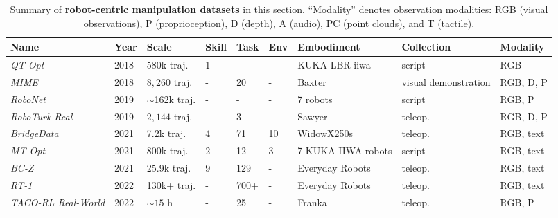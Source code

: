 \begin{table}[!ht]
    \centering
    \footnotesize
    \scriptsize
    \caption{Summary of \textbf{robot-centric manipulation datasets} in this section. ``Modality'' denotes observation modalities: RGB (visual observations), P (proprioception), D (depth), A (audio), PC (point clouds), and T (tactile).}
    \label{tab: robot_data}
    \vspace{-6pt}
    
    \renewcommand{\arraystretch}{1.4}
    \renewcommand\tabcolsep{4pt}
    
    \begin{tabular}{l p{0.7cm} p{1.8cm} p{1.7cm} p{1.2cm} p{1.2cm} p{1.5cm} p{1.7cm} p{1.5cm}}
    \toprule
    \textbf{Name} & \textbf{Year} & \textbf{Scale} & \textbf{Skill} & \textbf{Task} & \textbf{Env} & \textbf{Embodiment} & \textbf{Collection} & \textbf{Modality} \\
    \midrule

    \textit{QT-Opt} \cite{QT-Opt} & 2018 & 580k traj. 
    & 1 & - & - & KUKA LBR iiwa & script & RGB \\

    \textit{MIME}\cite{MIME} & 2018 & $8,260$ traj. 
    & - & 20 & - & Baxter & visual demonstration & RGB, D, P \\
    
    \textit{RoboNet} \cite{RoboNet}& 2019 & $\sim$162k traj. 
    & - & - & - & 7 robots & script & RGB, P \\

    \textit{RoboTurk-Real} \cite{RoboTurk} & 2019 & $2,144$ traj. 
    & - & 3 & - & Sawyer & teleop. & RGB, D, P \\
    
    \textit{BridgeData} \cite{Bridge} & 2021 & 7.2k traj. 
    & 4 & 71 & 10 & WidowX250s & teleop. & RGB, text \\
    
    \textit{MT-Opt} \cite{MT-Opt} & 2021 & 800k traj. 
    & 2 & 12 & 3 & 7 KUKA IIWA robots  & script & RGB, text \\

    \textit{BC-Z} \cite{BC-Z}& 2021 & 25.9k traj. 
    & 9 & 129 & - & Everyday Robots & teleop. & RGB, text \\

    \textit{RT-1} \cite{RT-1} & 2022 & 130k+ traj. 
    & - & 700+ & - & Everyday Robots & teleop. & RGB, text \\

    \textit{TACO-RL Real-World} \cite{TACO-RL-Real-World} & 2022 & $\sim15$ h 
    & - & 25 & - & Franka & teleop. & RGB, P \\


\end{tabular}
\end{table}
